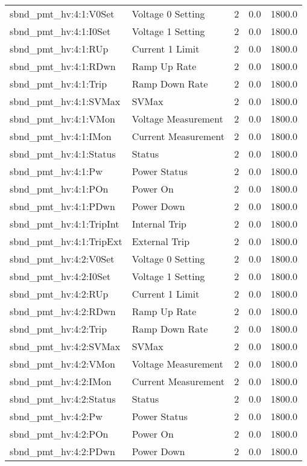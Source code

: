 \begin{center}
\begin{longtable}{l | l l l l }
sbnd\_pmt\_hv:4:1:V0Set & Voltage 0 Setting & 2 & 0.0 & 1800.0\\ 
sbnd\_pmt\_hv:4:1:I0Set & Voltage 1 Setting & 2 & 0.0 & 1800.0\\ 
sbnd\_pmt\_hv:4:1:RUp & Current 1 Limit & 2 & 0.0 & 1800.0\\ 
sbnd\_pmt\_hv:4:1:RDwn & Ramp Up Rate & 2 & 0.0 & 1800.0\\ 
sbnd\_pmt\_hv:4:1:Trip & Ramp Down Rate & 2 & 0.0 & 1800.0\\ 
sbnd\_pmt\_hv:4:1:SVMax & SVMax & 2 & 0.0 & 1800.0\\ 
sbnd\_pmt\_hv:4:1:VMon & Voltage Measurement & 2 & 0.0 & 1800.0\\ 
sbnd\_pmt\_hv:4:1:IMon & Current Measurement & 2 & 0.0 & 1800.0\\ 
sbnd\_pmt\_hv:4:1:Status & Status & 2 & 0.0 & 1800.0\\ 
sbnd\_pmt\_hv:4:1:Pw & Power Status & 2 & 0.0 & 1800.0\\ 
sbnd\_pmt\_hv:4:1:POn & Power On & 2 & 0.0 & 1800.0\\ 
sbnd\_pmt\_hv:4:1:PDwn & Power Down & 2 & 0.0 & 1800.0\\ 
sbnd\_pmt\_hv:4:1:TripInt & Internal Trip & 2 & 0.0 & 1800.0\\ 
sbnd\_pmt\_hv:4:1:TripExt & External Trip & 2 & 0.0 & 1800.0\\ 
sbnd\_pmt\_hv:4:2:V0Set & Voltage 0 Setting & 2 & 0.0 & 1800.0\\ 
sbnd\_pmt\_hv:4:2:I0Set & Voltage 1 Setting & 2 & 0.0 & 1800.0\\ 
sbnd\_pmt\_hv:4:2:RUp & Current 1 Limit & 2 & 0.0 & 1800.0\\ 
sbnd\_pmt\_hv:4:2:RDwn & Ramp Up Rate & 2 & 0.0 & 1800.0\\ 
sbnd\_pmt\_hv:4:2:Trip & Ramp Down Rate & 2 & 0.0 & 1800.0\\ 
sbnd\_pmt\_hv:4:2:SVMax & SVMax & 2 & 0.0 & 1800.0\\ 
sbnd\_pmt\_hv:4:2:VMon & Voltage Measurement & 2 & 0.0 & 1800.0\\ 
sbnd\_pmt\_hv:4:2:IMon & Current Measurement & 2 & 0.0 & 1800.0\\ 
sbnd\_pmt\_hv:4:2:Status & Status & 2 & 0.0 & 1800.0\\ 
sbnd\_pmt\_hv:4:2:Pw & Power Status & 2 & 0.0 & 1800.0\\ 
sbnd\_pmt\_hv:4:2:POn & Power On & 2 & 0.0 & 1800.0\\ 
sbnd\_pmt\_hv:4:2:PDwn & Power Down & 2 & 0.0 & 1800.0\\ 

\end{longtable}
\end{center}
